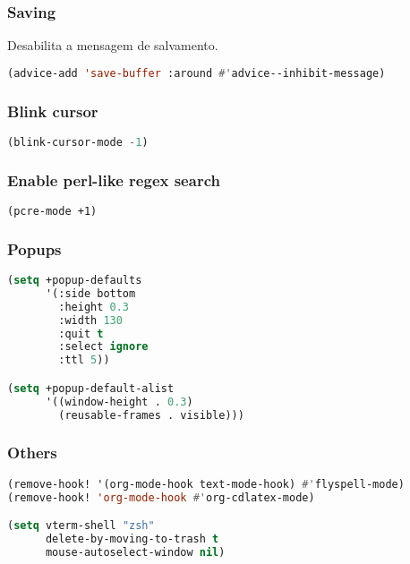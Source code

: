 \documentclass[11pt]{article}
\begin{document}
\subsubsection{Saving}
\label{sec:saving}
Desabilita a mensagem de salvamento.

\begin{lstlisting}[language=Lisp]
(advice-add 'save-buffer :around #'advice--inhibit-message)
\end{lstlisting}

\subsubsection{Blink cursor}
\label{sec:blink-cursor}
\begin{lstlisting}[language=Lisp]
(blink-cursor-mode -1)
\end{lstlisting}

\subsubsection{Enable perl-like regex search}
\label{sec:enable-perl-like-regex-search}
\begin{lstlisting}[language=Lisp]
(pcre-mode +1)
\end{lstlisting}

\subsubsection{Popups}
\label{sec:popups}
\begin{lstlisting}[language=Lisp]
(setq +popup-defaults
      '(:side bottom
        :height 0.3
        :width 130
        :quit t
        :select ignore
        :ttl 5))

(setq +popup-default-alist
      '((window-height . 0.3)
        (reusable-frames . visible)))
\end{lstlisting}

\subsubsection{Others}
\label{sec:others}
\begin{lstlisting}[language=Lisp]
(remove-hook! '(org-mode-hook text-mode-hook) #'flyspell-mode)
(remove-hook! 'org-mode-hook #'org-cdlatex-mode)

(setq vterm-shell "zsh"
      delete-by-moving-to-trash t
      mouse-autoselect-window nil)
\end{lstlisting}
\end{document}
